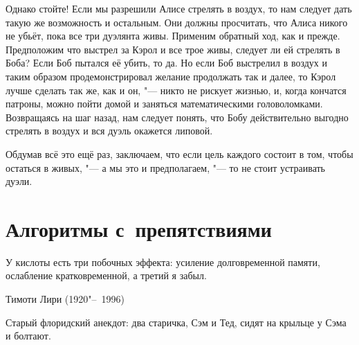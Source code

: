 \documentclass[twoside]{book}
\begin{document}
Однако стойте!
Если мы разрешили Алисе стрелять в воздух, то нам следует дать такую же возможность и остальным. 
Они должны просчитать, что Алиса никого не убьёт, пока все три дуэлянта живы. 
Применим обратный ход, как и прежде.
Предположим что выстрел за Кэрол и все трое живы,
следует ли ей стрелять в Боба? 
Если Боб пытался её убить, то да.
Но если Боб выстрелил в воздух и таким образом продемонстрировал желание продолжать так и далее,
то Кэрол лучше сделать так же, как и он, "---
никто не рискует жизнью, и, когда кончатся патроны, можно пойти домой и заняться математическими головоломками.
Возвращаясь на шаг назад, нам следует понять, что Бобу действительно выгодно стрелять в воздух и вся дуэль окажется липовой.

Обдумав всё это ещё раз, заключаем, что если цель каждого состоит в том, чтобы остаться в живых, "--- а мы это и предполагаем, "--- то не стоит устраивать дуэли.
\heart

\chapter{Алгоритмы с~препятствиями}

\setlength{\epigraphwidth}{.6\textwidth}
\epigraph{У кислоты есть три побочных эффекта: усиление долговременной памяти, ослабление кратковременной, а третий я забыл.\vspace{1ex}}{Тимоти Лири (1920"--~1996)}

Старый флоридский анекдот:
два старичка, Сэм и Тед, сидят на крыльце у Сэма и болтают.
\end{document}
